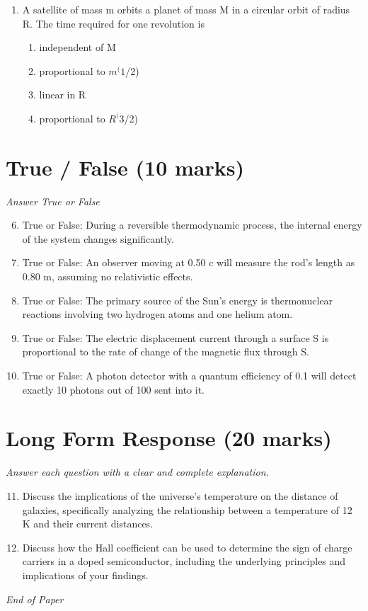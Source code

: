 \documentclass[12pt]{article}
\begin{document}
\begin{enumerate}[label=\arabic*.]
\begin{enumerate}[label=(\alph*)]
    \item 5
    \item 6
    \item 20
\end{enumerate}
\item A satellite of mass m orbits a planet of mass M in a circular orbit of radius R. The time required for one revolution is
\begin{enumerate}[label=(\alph*)]
    \item independent of M
    \item proportional to $m^(1$/2)
    \item linear in R
    \item proportional to $R^(3$/2)
\end{enumerate}
\end{enumerate}

\section*{True / False (10 marks)}
\textit{Answer True or False}
\begin{enumerate}[label=\arabic*.]
\setcounter{enumi}{5}
\item True or False: During a reversible thermodynamic process, the internal energy of the system changes significantly.
\item True or False: An observer moving at 0.50 c will measure the rod's length as 0.80 m, assuming no relativistic effects.
\item True or False: The primary source of the Sun's energy is thermonuclear reactions involving two hydrogen atoms and one helium atom.
\item True or False: The electric displacement current through a surface S is proportional to the rate of change of the magnetic flux through S.
\item True or False: A photon detector with a quantum efficiency of 0.1 will detect exactly 10 photons out of 100 sent into it.
\end{enumerate}

\section*{Long Form Response (20 marks)}
\textit{Answer each question with a clear and complete explanation.}
\begin{enumerate}[label=\arabic*.]
\setcounter{enumi}{10}
\item Discuss the implications of the universe's temperature on the distance of galaxies, specifically analyzing the relationship between a temperature of 12 K and their current distances.
\item Discuss how the Hall coefficient can be used to determine the sign of charge carriers in a doped semiconductor, including the underlying principles and implications of your findings.
\end{enumerate}

\vfill
\noindent\textit{End of Paper}
\end{document}
